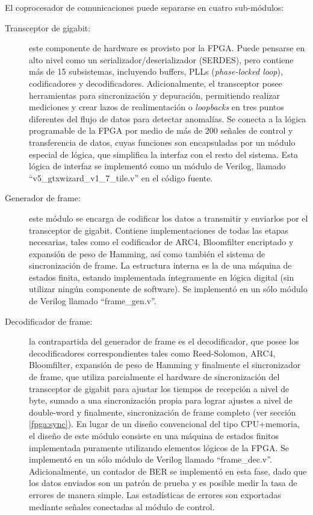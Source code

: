 El coprocesador de comunicaciones puede separarse en cuatro sub-módulos:

\begin{description}
 \item[Transceptor de gigabit:] este componente de hardware es provisto por la FPGA. Puede pensarse en alto nivel como un serializador/deserializador (SERDES), pero contiene más de 15 subsistemas, incluyendo buffers, PLLs (\textit{phase-locked loop}), codificadores y decodificadores. Adicionalmente, el transceptor posee herramientas para sincronización y depuración, permitiendo realizar mediciones y crear lazos de realimentación o \textit{loopbacks} en tres puntos diferentes del flujo de datos para detectar anomalías. Se conecta a la lógica programable de la FPGA por medio de más de 200 señales de control y transferencia de datos, cuyas funciones son encapsuladas por un módulo especial de lógica, que simplifica la interfaz con el resto del sistema. Esta lógica de interfaz se implementó como un módulo de Verilog, llamado ``v5\_gtxwizard\_v1\_7\_tile.v'' en el código fuente.

 \item[Generador de frame:] este módulo se encarga de codificar los datos a transmitir y enviarlos por el transceptor de gigabit. Contiene implementaciones de todas las etapas necesarias, tales como el codificador de ARC4, Bloomfilter encriptado y expansión de peso de Hamming, así como también el sistema de sincronización de frame. La estructura interna es la de una máquina de estados finita, estando implementada íntegramente en lógica digital (sin utilizar ningún componente de software). Se implementó en un sólo módulo de Verilog llamado ``frame\_gen.v''.
 
 \item[Decodificador de frame:] la contrapartida del generador de frame es el decodificador, que posee los decodificadores correspondientes tales como Reed-Solomon, ARC4, Bloomfilter, expansión de peso de Hamming y finalmente el sincronizador de frame, que utiliza parcialmente el hardware de sincronización del transceptor de gigabit para ajustar los tiempos de recepción a nivel de byte, sumado a una sincronización propia para lograr ajustes a nivel de double-word y finalmente, sincronización de frame completo (ver sección \ref{fpga:sync}). En lugar de un diseño convencional del tipo CPU+memoria, el diseño de este módulo consiste en una máquina de estados finitos implementada puramente utilizando elementos lógicos de la FPGA. Se implementó en un sólo módulo de Verilog llamado ``frame\_dec.v''. Adicionalmente, un contador de BER se implementó en esta fase, dado que los datos enviados son un patrón de prueba y es posible medir la tasa de errores de manera simple. Las estadísticas de errores son exportadas mediante señales conectadas al módulo de control.
 
 \end{description}

